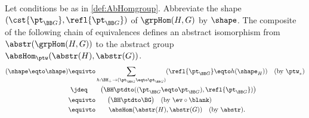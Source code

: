 \begin{lemma}\label{lem:grpHomOK}
Let conditions be as in \cref{def:AbHomgroup}. Abbreviate the shape
$(\cst{\pt_{\BB G}},\refl{\pt_{\BB G}})$ of $\grpHom(H,G)$ by $\sh$. 
The composite of the following chain of equivalences 
defines an abstract isomorphism from $\abstr(\grpHom(H,G))$ 
to the abstract group $\absHom_{\ptw}(\abstr(H),\abstr(G))$.
\begin{align*}
(\sh\eqto\sh) &\equivto 
\sum_{h:\BH_\div\to(\pt_{\BB G}\eqto\pt_{\BB G})} 
  (\refl{\pt_{\BB G}}\eqto h(\sh_H)) \quad\text{(by $\ptw_*$)}\\
              &~\jdeq \qquad \bigl(\BH\ptdto((\pt_{\BB G}\eqto\pt_{\BB G}),\refl{\pt_{\BB G}})\bigr)\\
 &\equivto \qquad\! \bigl(\BH\ptdto\BG\bigr) 
 \quad\text{(by $\ev\circ\blank$)}\\
 &\equivto \qquad \absHom(\abstr(H),\abstr(G))
 \quad\text{(by $\abstr$)}.
\end{align*}
\end{lemma}

